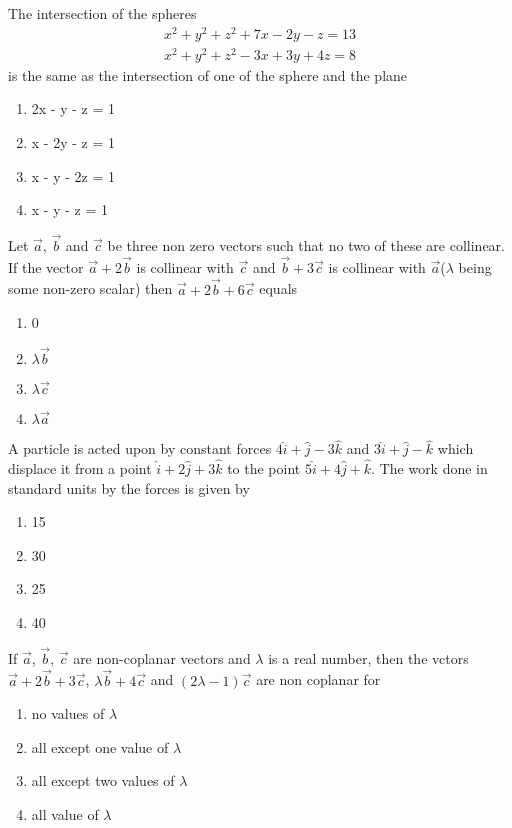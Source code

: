 \item The intersection of the spheres
\begin{align}
x^2 + y^2 + z^2 + 7x - 2y - z = 13
\end{align}
\begin{align}
x^2 + y^2 + z^2 - 3x + 3y + 4z = 8
\end{align}
is the same as the intersection of one of the sphere and the plane
\begin{enumerate}
\item 2x - y - z = 1
\item x - 2y - z = 1
\item x - y - 2z = 1
\item x - y - z = 1
\end{enumerate}

\item Let $\overrightarrow{a}$, $\overrightarrow{b}$ and $\overrightarrow{c}$ be three non zero vectors such that no two of these are collinear. If the vector $\overrightarrow{a} + 2\overrightarrow{b}$ is collinear with $\overrightarrow{c}$ and $\overrightarrow{b} + 3\overrightarrow{c}$ is collinear with $\overrightarrow{a}$($\lambda$ being some non-zero scalar) then $\overrightarrow{a} + 2\overrightarrow{b} + 6\overrightarrow{c}$ equals
\begin{enumerate}
\item 0
\item $\lambda\overrightarrow{b}$
\item $\lambda\overrightarrow{c}$
\item $\lambda\overrightarrow{a}$
\end{enumerate}

\item A particle is acted upon by constant forces $4\hat{i} + \hat{j} - 3\hat{k}$ and $3\hat{i} + \hat{j} - \hat{k}$ which displace it from a point $\hat{i} + 2\hat{j} + 3\hat{k}$ to the point $5\hat{i} + 4\hat{j} + \hat{k}$. The work done in standard units by the forces is given by
\begin{enumerate}
\item 15
\item 30
\item 25
\item 40
\end{enumerate}

\item If $\overrightarrow{a}$, $\overrightarrow{b}$, $\overrightarrow{c}$ are non-coplanar vectors and $\lambda$ is a real number, then the vctors $\overrightarrow{a} + 2\overrightarrow{b} + 3\overrightarrow{c}$, $\lambda\overrightarrow{b}  + 4\overrightarrow{c}$ and $(2\lambda - 1)\overrightarrow{c}$ are non coplanar for
\begin{enumerate}
\item no values of $\lambda$
\item all except one value of $\lambda$
\item all except two values of $\lambda$
\item all value of $\lambda$
\end{enumerate}


